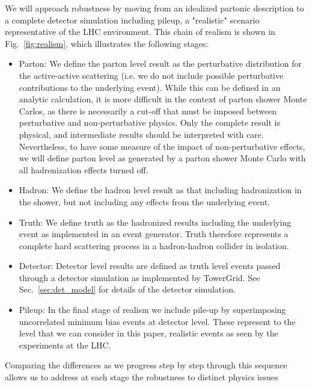 \documentclass[11pt,letterpaper]{article}
\DeclareRobustCommand{\Sec}[1]{Sec.~\ref{#1}}
\DeclareRobustCommand{\Fig}[1]{Fig.~\ref{#1}}
\begin{document}
We will approach robustness by moving from an idealized partonic description to a complete detector simulation including pileup, a "realistic" scenario representative of the LHC environment. This chain of realism is shown in \Fig{fig:realism}, which illustrates the following stages:
\begin{itemize}
\item Parton: We define the parton level result as the perturbative distribution for the active-active scattering (i.e. we do not include possible perturbative contributions to the underlying event). While this can be defined in an analytic calculation, it is more difficult in the context of parton shower Monte Carlos, as there is necessarily a cut-off that must be imposed between perturbative and non-perturbative physics. Only the complete result is physical, and intermediate results should be interpreted with care. Nevertheless, to have some measure of the impact of non-perturbative effects, we will define parton level as generated by a parton shower Monte Carlo with all hadronization effects turned off.
\item Hadron: We define the hadron level result as that including hadronization in the shower, but not including any effects from the underlying event.
\item Truth: We define truth as the hadronized results including the underlying event as implemented in an event generator. Truth therefore represents a complete hard scattering process in a hadron-hadron collider in isolation.
\item Detector: Detector level results are defined as truth level events passed through a detector simulation as implemented by TowerGrid. See \Sec{sec:det_model} for details of the detector simulation.
\item Pileup: In the final stage of realism we include pile-up by superimposing uncorrelated minimum bias events at detector level. These represent to the level that we can consider in this paper, realistic events as seen by the experiments at the LHC.
\end{itemize}
Comparing the differences as we progress step by step through this sequence allows us to address at each stage the robustness to distinct physics issues
\end{document}
